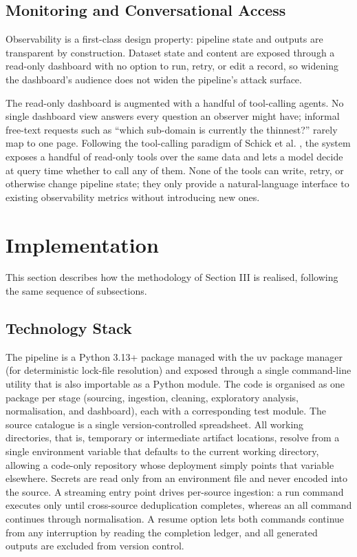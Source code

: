 \documentclass[conference]{IEEEtran}
\begin{document}
\subsection{Monitoring and Conversational Access}

Observability is a first-class design property: pipeline state and outputs are transparent by construction. Dataset state and content are exposed through a read-only dashboard with no option to run, retry, or edit a record, so widening the dashboard's audience does not widen the pipeline's attack surface.

The read-only dashboard is augmented with a handful of tool-calling agents. No single dashboard view answers every question an observer might have; informal free-text requests such as ``which sub-domain is currently the thinnest?'' rarely map to one page. Following the tool-calling paradigm of Schick et al. \cite{schick2023toolformer}, the system exposes a handful of read-only tools over the same data and lets a model decide at query time whether to call any of them. None of the tools can write, retry, or otherwise change pipeline state; they only provide a natural-language interface to existing observability metrics without introducing new ones.

\section{Implementation}

This section describes how the methodology of Section III is realised, following the same sequence of subsections.

\subsection{Technology Stack}

The pipeline is a Python 3.13+ package managed with the uv package manager (for deterministic lock-file resolution) and exposed through a single command-line utility that is also importable as a Python module. The code is organised as one package per stage (sourcing, ingestion, cleaning, exploratory analysis, normalisation, and dashboard), each with a corresponding test module. The source catalogue is a single version-controlled spreadsheet. All working directories, that is, temporary or intermediate artifact locations, resolve from a single environment variable that defaults to the current working directory, allowing a code-only repository whose deployment simply points that variable elsewhere. Secrets are read only from an environment file and never encoded into the source. A streaming entry point drives per-source ingestion: a run command executes only until cross-source deduplication completes, whereas an all command continues through normalisation. A resume option lets both commands continue from any interruption by reading the completion ledger, and all generated outputs are excluded from version control.
\end{document}
